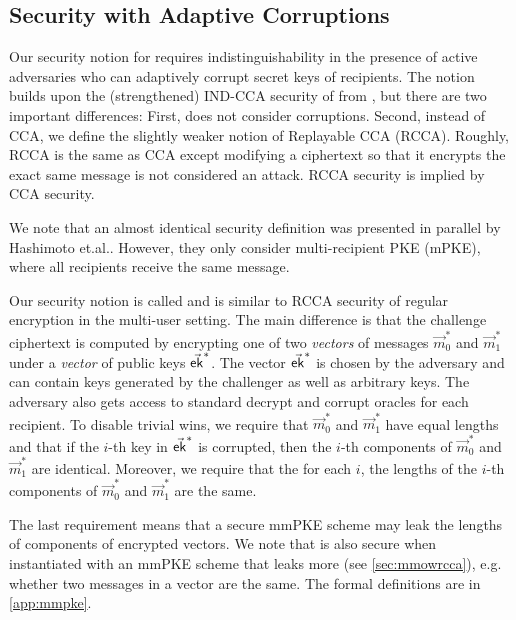 \subsection{Security with Adaptive Corruptions}
Our security notion for \mmPKE requires indistinguishability in the presence of active adversaries who can adaptively corrupt secret keys of recipients. The notion builds upon the (strengthened) IND-CCA security of \mmPKE from \cite{ASIACCS:PinPoeSch14}, but there are two important differences: First, \cite{ASIACCS:PinPoeSch14} does not consider corruptions. Second, instead of CCA, we define the slightly weaker notion of Replayable CCA (RCCA). Roughly, RCCA \cite{C:CanKraNie03} is the same as CCA except modifying a ciphertext so that it encrypts the exact same message is not considered an attack. RCCA security is implied by CCA security.

We note that an almost identical security definition was presented in parallel by Hashimoto
et.al.\cite{hashimoto2021cmpke}. However, they only consider multi-recipient PKE (mPKE), where all
recipients receive the same message.

Our security notion is called \mmindrcca and is similar to
RCCA security of regular encryption in the multi-user setting. The main difference is that the challenge ciphertext is computed by encrypting one of two \emph{vectors} of messages $\vec m_0^*$ and $\vec m_1^*$ under a \emph{vector} of public keys $\vec{{\mathsf{ek}}}^*$.
The vector $\vec{{\mathsf{ek}}}^*$ is chosen by the adversary and can contain keys generated by the challenger as well as
arbitrary keys. The adversary also gets access to standard decrypt and corrupt oracles for each recipient.
%
To disable trivial wins, we require that  $\vec m_0^*$ and $\vec m_1^*$ have equal lengths and that if the $i$-th key in $\vec{{\mathsf{ek}}}^*$ is corrupted, then the $i$-th components of $\vec m_0^*$ and $\vec m_1^*$ are identical. Moreover, we require that the for each $i$, the lengths of the $i$-th components of  $\vec m_0^*$ and $\vec m_1^*$ are the same.

The last requirement means that a secure mmPKE scheme may leak the lengths of components of encrypted vectors. We note that \saik is also secure when instantiated with an mmPKE scheme that leaks more (see \cref{sec:mmowrcca}), e.g. whether two messages in a vector are the same.
%
%
%
The formal definitions are in \cref{app:mmpke}.

